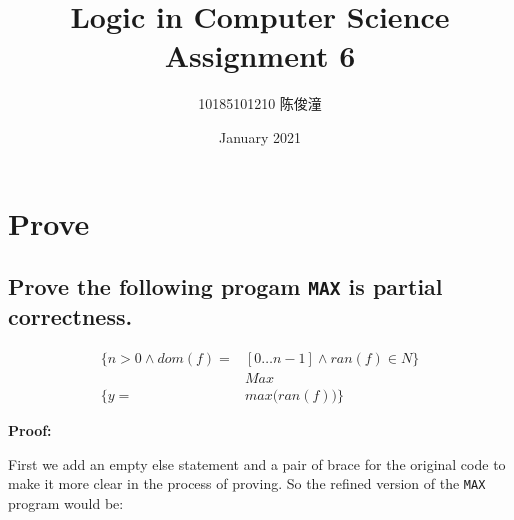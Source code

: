 \documentclass{ctexart}
\title{Logic in Computer Science Assignment 6}
\author{10185101210 陈俊潼}
\date{January 2021}
\def\c{\wedge}
\begin{document}
\maketitle

\section{Prove}

\subsection{Prove the following progam \texttt{MAX} is partial correctness.}
\begin{equation*}
    \begin{split}
        \{n > 0 \c dom(f) =& [0\ldots n-1] \c ran(f) \in N\} \\
        & Max \\
        \{y = &max\Big(ran(f)\Big)\}
    \end{split}
\end{equation*}

\textbf{Proof:}

First we add an empty else statement and a pair of brace for the original code to make it more clear in the process of proving. So the refined version of the \texttt{MAX} program would be:
\end{document}
